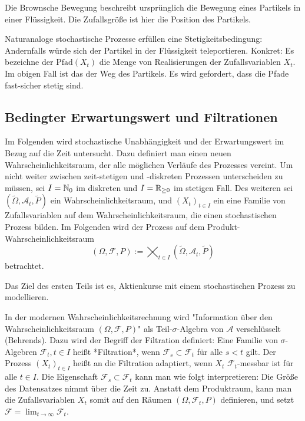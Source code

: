 \begin{bsp}
Die Brownsche Bewegung beschreibt ursprünglich die Bewegung eines Partikels in 
einer Flüssigkeit. Die Zufallsgröße ist hier die Position des Partikels.

Naturanaloge stochastische Prozesse erfüllen eine Stetigkeitsbedingung: 
Andernfalls würde sich der Partikel in der Flüssigkeit teleportieren. 
Konkret: Es bezeichne der $\text{Pfad}( X_t)$ die Menge von Realisierungen der Zufallsvariablen $X_t$. 
Im obigen Fall ist das der Weg des Partikels. Es wird gefordert, dass die Pfade fast-sicher stetig sind.

\end{bsp}

\subsection{Bedingter Erwartungswert und Filtrationen}

Im Folgenden wird stochastische Unabhängigkeit und der Erwartungswert im Bezug auf die Zeit untersucht. 
Dazu definiert man einen neuen Wahrscheinlichkeitsraum, 
der alle möglichen Verläufe des Prozesses vereint. 
Um nicht weiter zwischen zeit-stetigen und -diskreten Prozessen unterscheiden zu müssen, 
sei $I = \Bbb N_0$ im diskreten und $I = \Bbb R_{\ge 0}$ im stetigen Fall. 
Des weiteren sei $(\tilde \Omega, \mathcal A_t, \tilde P)$ ein Wahrscheinlichkeitsraum, 
und $(X_t)_{t \in I}$ ein eine Familie von Zufallsvariablen auf dem Wahrscheinlichkeitsraum, 
die einen stochastischen Prozess bilden. Im Folgenden wird der Prozess 
auf dem Produkt-Wahrscheinlichkeitsraum
$$(\Omega, \mathcal F, P) := \bigtimes_{t \in I}(\tilde \Omega, \mathcal A_t,\tilde P)$$
betrachtet.

Das Ziel des ersten Teils ist es, Aktienkurse mit einem stochastischen Prozess 
zu modellieren.

\begin{defi}[Adaptiertheit]
In der modernen Wahrscheinlichkeitsrechnung wird "Information über den
Wahrscheinlichkeitsraum $(\Omega, \mathcal F, P)$" als Teil-$\sigma$-Algebra 
von $\mathcal A$ verschlüsselt (Behrends). Dazu wird der Begriff der Filtration 
definiert: Eine Familie von $\sigma$-Algebren $\mathcal F_t, t \in I$ heißt *Filtration*, 
wenn $\mathcal F_s \subset \mathcal F_t$ für alle $s \lt t$ gilt. 
Der Prozess $(X_t)_{t \in I}$ heißt an die Filtration adaptiert, 
wenn $X_t$ $\mathcal F_t$-messbar ist für alle $t \in I$. Die Eigenschaft 
$\mathcal F_s \subset \mathcal F_t$ kann man wie folgt interpretieren: 
Die Größe des Datensatzes nimmt über die Zeit zu. Anstatt dem Produktraum, kann man 
die Zufallsvariablen $X_t$ somit auf den Räumen $(\Omega, \mathcal F_t, P)$ definieren, 
und setzt $\mathcal F = \lim_{t \to \infty} \mathcal F_t$.

\end{defi}


